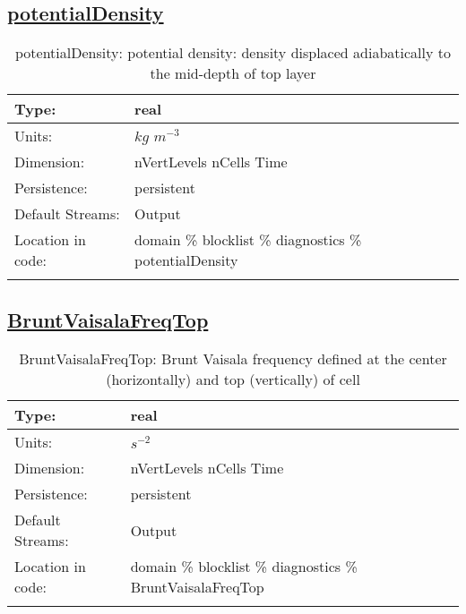 \subsection[potentialDensity]{\hyperref[sec:var_tab_diagnostics]{potentialDensity}}
\label{subsec:var_sec_diagnostics_potentialDensity}
\begin{center}
\begin{longtable}{| p{2.0in} | p{4.0in} |}
        \hline 
        Type: & real \\
        \hline 
        Units: & $kg$ $m^{-3}$ \\
        \hline 
        Dimension: & nVertLevels nCells Time \\
        \hline 
        Persistence: & persistent \\
        \hline 
		 Default Streams: & Output  \\
        \hline 
		 Location in code: & domain \% blocklist \% diagnostics \% potentialDensity \\
		 \hline 
    \caption{potentialDensity: potential density: density displaced adiabatically to the mid-depth of top layer}
\end{longtable}
\end{center}
\subsection[BruntVaisalaFreqTop]{\hyperref[sec:var_tab_diagnostics]{BruntVaisalaFreqTop}}
\label{subsec:var_sec_diagnostics_BruntVaisalaFreqTop}
\begin{center}
\begin{longtable}{| p{2.0in} | p{4.0in} |}
        \hline 
        Type: & real \\
        \hline 
        Units: & $s^{-2}$ \\
        \hline 
        Dimension: & nVertLevels nCells Time \\
        \hline 
        Persistence: & persistent \\
        \hline 
		 Default Streams: & Output  \\
        \hline 
		 Location in code: & domain \% blocklist \% diagnostics \% BruntVaisalaFreqTop \\
		 \hline 
    \caption{BruntVaisalaFreqTop: Brunt Vaisala frequency defined at the center (horizontally) and top (vertically) of cell}
\end{longtable}
\end{center}

